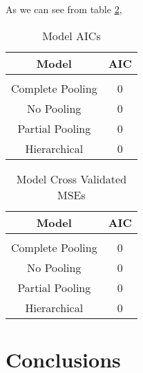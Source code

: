 \documentclass{report}
\begin{document}
As we can see from table \ref{MSEs}, %

\begin{table}[!htbp] \centering
  \caption{Model AICs}
  \label{AICs}
  \begin{tabular}[c]{c|c}
\\    Model & AIC \\
    \hline \\
    Complete Pooling & 0 \\
    No Pooling & 0 \\
    Partial Pooling & 0 \\
    Hierarchical & 0 \\
  \end{tabular}
\end{table}

\begin{table}[!htbp] \centering
  \caption{Model Cross Validated MSEs}
  \label{MSEs}
  \begin{tabular}[c]{c|c}
\\    Model & AIC \\
    \hline \\
    Complete Pooling & 0 \\
    No Pooling & 0 \\
    Partial Pooling & 0 \\
    Hierarchical & 0 \\
  \end{tabular}
\end{table}

\section*{Conclusions}
\end{document}
